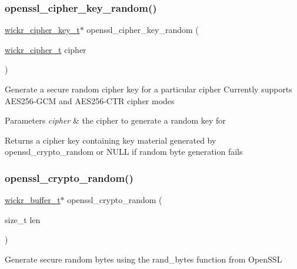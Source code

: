 \subsubsection{\texorpdfstring{openssl\+\_\+cipher\+\_\+key\+\_\+random()}{openssl\_cipher\_key\_random()}}
{\footnotesize\ttfamily \hyperlink{structwickr__cipher__key}{wickr\+\_\+cipher\+\_\+key\+\_\+t}$\ast$ openssl\+\_\+cipher\+\_\+key\+\_\+random (\begin{DoxyParamCaption}\item[{\hyperlink{structwickr__cipher}{wickr\+\_\+cipher\+\_\+t}}]{cipher }\end{DoxyParamCaption})}

Generate a secure random cipher key for a particular cipher Currently supports A\+E\+S256-\/\+G\+CM and A\+E\+S256-\/\+C\+TR cipher modes


\begin{DoxyParams}{Parameters}
{\em cipher} & the cipher to generate a random key for \\
\hline
\end{DoxyParams}
\begin{DoxyReturn}{Returns}
a cipher key containing key material generated by \textquotesingle{}openssl\+\_\+crypto\+\_\+random\textquotesingle{} or N\+U\+LL if random byte generation fails 
\end{DoxyReturn}
\mbox{\label{group__openssl__crypto_gadfe740d19f9f2096b818553e90dae0d7}} 
\subsubsection{\texorpdfstring{openssl\+\_\+crypto\+\_\+random()}{openssl\_crypto\_random()}}
{\footnotesize\ttfamily \hyperlink{structwickr__buffer}{wickr\+\_\+buffer\+\_\+t}$\ast$ openssl\+\_\+crypto\+\_\+random (\begin{DoxyParamCaption}\item[{size\+\_\+t}]{len }\end{DoxyParamCaption})}

Generate secure random bytes using the rand\+\_\+bytes function from Open\+S\+SL


